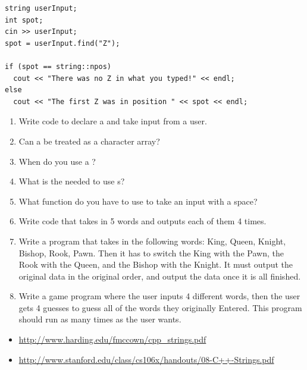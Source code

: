 \noindent\begin{minipage}{\linewidth}\begin{lstlisting}
string userInput;
int spot;
cin >> userInput;
spot = userInput.find("Z");

if (spot == string::npos)
  cout << "There was no Z in what you typed!" << endl;
else
  cout << "The first Z was in position " << spot << endl;
\end{lstlisting}\end{minipage}
\begin{enumerate}
\item Write code to declare a  and take input from a user.
\item Can a  be treated as a character array?
\item When do you use a ?
\item What is the  needed to use s?
\item What function do you have to use to take an input with a space?
\item Write code that takes in 5 words and outputs each of them 4 times.

\item Write a program that takes in the following words: King, Queen, Knight, Bishop, Rook, Pawn. 
Then it has to switch the King with the Pawn, the Rook with the Queen, and the Bishop with the Knight.
It must output the original data in the original order, and output the data once it is all finished.

\item Write a game program where the user inputs 4 different words, then the user gets 4 guesses to guess all of the words they originally Entered. This program should run as many times as the user wants.
\end{enumerate}


\begin{itemize}
\item \url{http://www.harding.edu/fmccown/cpp_strings.pdf}
\item \url{http://www.stanford.edu/class/cs106x/handouts/08-C++-Strings.pdf}
\end{itemize}

